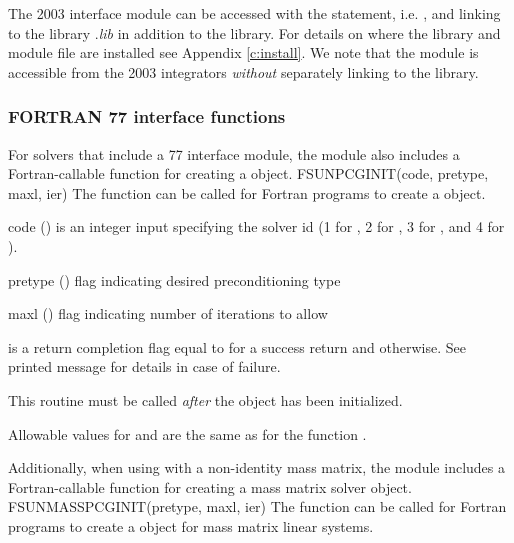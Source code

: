 The {\F} 2003 {\sunlinsolpcg} interface module can be accessed with the 
statement, i.e. , and linking to the library
.{\em lib} in addition to the {\CC} library.
For details on where the library and module file
 are installed see Appendix \ref{c:install}.
We note that the module is accessible from the {\F} 2003 {\sundials} integrators
\textit{without} separately linking to the
 library.

\subsubsection*{FORTRAN 77 interface functions}
For solvers that include a {\F} 77 interface module, the
{\sunlinsolpcg} module also includes a Fortran-callable function
for creating a  object.
%
%
{
  FSUNPCGINIT(code, pretype, maxl, ier)
}
{
  The function  can be called for Fortran programs
  to create a {\sunlinsolpcg} object.
}
{
  \begin{args}[pretype]
  \item[code] ()
    is an integer input specifying the solver id (1 for {\cvode}, 2
    for {\ida}, 3 for {\kinsol}, and 4 for {\arkode}).
  \item[pretype] ()
    flag indicating desired preconditioning type
  \item[maxl] ()
    flag indicating number of iterations to allow
  \end{args}
}
{
   is a return completion flag equal to  for a success
  return and  otherwise. See printed message for details in case
  of failure.
}
{
  This routine must be called \emph{after} the {\nvector} object has
  been initialized.

  Allowable values for  and  are the same as for
  the {\CC} function .
}
Additionally, when using {\arkode} with a non-identity
mass matrix, the {\sunlinsolpcg} module includes a Fortran-callable
function for creating a  mass matrix solver
object.
%
%
{
  FSUNMASSPCGINIT(pretype, maxl, ier)
}
{
  The function  can be called for Fortran programs
  to create a {\sunlinsolpcg} object for mass matrix linear systems.
}
